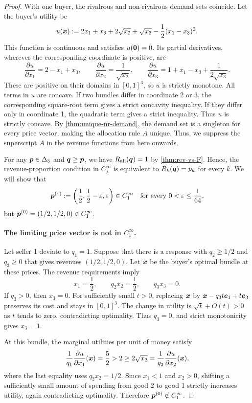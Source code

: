 \begin{proof}
With one buyer, the rivalrous and non-rivalrous demand sets coincide.
Let the buyer's utility be
\[ u(\bm{x}) := 2x_1 + x_3 + 2\sqrt{x_2} + \sqrt{x_3} - \frac12(x_1 - x_3)^2. \]
This function is continuous and satisfies $u(\mathbf{0}) = 0$.
Its partial derivatives, wherever the corresponding coordinate is positive, are
\[ \frac{\partial u}{\partial x_1} = 2 - x_1 + x_3, \qquad
    \frac{\partial u}{\partial x_2} = \frac{1}{\sqrt{x_2}}, \qquad
    \frac{\partial u}{\partial x_3} = 1 + x_1 - x_3 + \frac{1}{2\sqrt{x_3}}. \]
These are positive on their domains in $[0, 1]^3$, so $u$ is strictly monotone.
All terms in $u$ are concave.
If two bundles differ in coordinate 2 or 3, the corresponding square-root term
gives a strict concavity inequality.
If they differ only in coordinate 1, the quadratic term gives a strict inequality.
Thus $u$ is strictly concave.
By \cref{thm:unique-nr-demand}, the demand set is a singleton for every price vector,
making the allocation rule $A$ unique.
Thus, we suppress the superscript $A$ in the revenue functions from here onwards.

For any $\bm{p} \in \Delta_3$ and $\bm{q} \ge \bm{p}$, we have
$R_{\operatorname{all}}(\bm{q}) = 1$ by \cref{thm:rev-vs-F}.
Hence, the revenue-proportion condition in $C_j^\infty$ is equivalent to
$R_k(\bm{q}) = p_k$ for every $k$.
We will show that
\[ \bm{p}^{(\varepsilon)} := \left(\frac12, \frac12 - \varepsilon, \varepsilon\right) \in C_1^\infty
    \quad \text{for every } 0 < \varepsilon \le \frac1{64}, \]
but $\bm{p}^{(0)} = (1/2, 1/2, 0) \notin C_1^\infty$.

\paragraph{The limiting price vector is not in $C_1^\infty$.}
Let seller 1 deviate to $q_1 = 1$.
Suppose that there is a response with $q_2 \ge 1/2$ and $q_3 \ge 0$
that gives revenues $(1/2, 1/2, 0)$.
Let $\bm{x}$ be the buyer's optimal bundle at these prices.
The revenue requirements imply
\[ x_1 = \frac12, \qquad q_2x_2 = \frac12, \qquad q_3x_3 = 0. \]
If $q_3 > 0$, then $x_3 = 0$.
For sufficiently small $t > 0$, replacing $\bm{x}$ by
$\bm{x} - q_3t\bm{e}_1 + t\bm{e}_3$ preserves its cost and stays in $[0, 1]^3$.
The change in utility is $\sqrt{t} + O(t) > 0$ as $t$ tends to zero,
contradicting optimality.
Thus $q_3 = 0$, and strict monotonicity gives $x_3 = 1$.

At this bundle, the marginal utilities per unit of money satisfy
\[ \frac{1}{q_1}\frac{\partial u}{\partial x_1}(\bm{x}) = \frac52 > 2
    \ge 2\sqrt{x_2} = \frac{1}{q_2}\frac{\partial u}{\partial x_2}(\bm{x}), \]
where the last equality uses $q_2x_2 = 1/2$.
Since $x_1 < 1$ and $x_2 > 0$, shifting a sufficiently small amount of spending
from good 2 to good 1 strictly increases utility, again contradicting optimality.
Therefore $\bm{p}^{(0)} \notin C_1^\infty$.


\end{proof}
